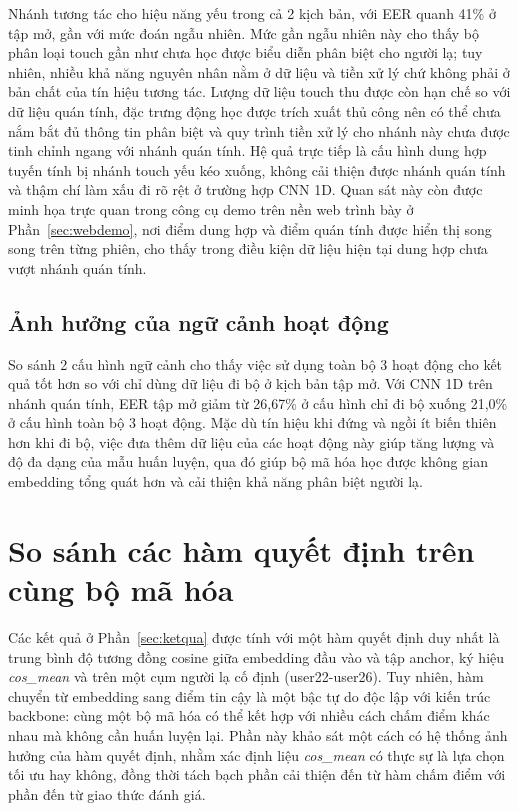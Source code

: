\documentclass[../DoAn.tex]{subfiles}
\begin{document}
Nhánh tương tác cho hiệu năng yếu trong cả 2 kịch bản, với EER quanh 41\% ở tập mở, gần với mức đoán ngẫu nhiên. Mức gần ngẫu nhiên này cho thấy bộ phân loại touch gần như chưa học được biểu diễn phân biệt cho người lạ; tuy nhiên, nhiều khả năng nguyên nhân nằm ở dữ liệu và tiền xử lý chứ không phải ở bản chất của tín hiệu tương tác. Lượng dữ liệu touch thu được còn hạn chế so với dữ liệu quán tính, đặc trưng động học được trích xuất thủ công nên có thể chưa nắm bắt đủ thông tin phân biệt và quy trình tiền xử lý cho nhánh này chưa được tinh chỉnh ngang với nhánh quán tính. Hệ quả trực tiếp là cấu hình dung hợp tuyến tính bị nhánh touch yếu kéo xuống, không cải thiện được nhánh quán tính và thậm chí làm xấu đi rõ rệt ở trường hợp CNN 1D. Quan sát này còn được minh họa trực quan trong công cụ demo trên nền web trình bày ở Phần~\ref{sec:webdemo}, nơi điểm dung hợp và điểm quán tính được hiển thị song song trên từng phiên, cho thấy trong điều kiện dữ liệu hiện tại dung hợp chưa vượt nhánh quán tính.

\subsection{Ảnh hưởng của ngữ cảnh hoạt động}

So sánh 2 cấu hình ngữ cảnh cho thấy việc sử dụng toàn bộ 3 hoạt động cho kết quả tốt hơn so với chỉ dùng dữ liệu đi bộ ở kịch bản tập mở. Với CNN 1D trên nhánh quán tính, EER tập mở giảm từ 26,67\% ở cấu hình chỉ đi bộ xuống 21,0\% ở cấu hình toàn bộ 3 hoạt động. Mặc dù tín hiệu khi đứng và ngồi ít biến thiên hơn khi đi bộ, việc đưa thêm dữ liệu của các hoạt động này giúp tăng lượng và độ đa dạng của mẫu huấn luyện, qua đó giúp bộ mã hóa học được không gian embedding tổng quát hơn và cải thiện khả năng phân biệt người lạ.

\section{So sánh các hàm quyết định trên cùng bộ mã hóa}
\label{sec:scorer}

Các kết quả ở Phần~\ref{sec:ketqua} được tính với một hàm quyết định duy nhất là trung bình độ tương đồng cosine giữa embedding đầu vào và tập anchor, ký hiệu \textit{cos\_mean} và trên một cụm người lạ cố định (user22-user26). Tuy nhiên, hàm chuyển từ embedding sang điểm tin cậy là một bậc tự do độc lập với kiến trúc backbone: cùng một bộ mã hóa có thể kết hợp với nhiều cách chấm điểm khác nhau mà không cần huấn luyện lại. Phần này khảo sát một cách có hệ thống ảnh hưởng của hàm quyết định, nhằm xác định liệu \textit{cos\_mean} có thực sự là lựa chọn tối ưu hay không, đồng thời tách bạch phần cải thiện đến từ hàm chấm điểm với phần đến từ giao thức đánh giá.
\end{document}
